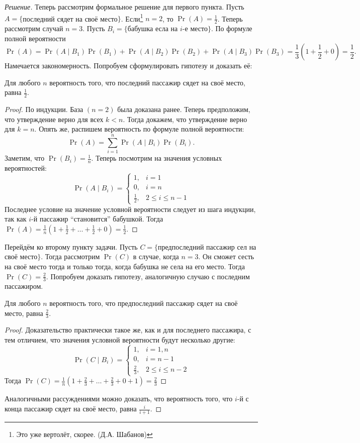 \begin{proof}[Решение]
    Теперь рассмотрим формальное решение для первого пункта. Пусть \(A = \{\)последний сядет на своё место\(\}\). Если\footnote{Это уже вертолёт, скорее. (Д.А. Шабанов)} \(n = 2\), то \(\Pr(A) = \frac{1}{2}\). Теперь рассмотрим случай \(n = 3\). Пусть \(B_{i} = \{\)бабушка есла на \(i\)-е место\(\}\). По формуле полной вероятности \[\Pr(A) = \Pr(A \mid B_{1})\Pr(B_{1}) + \Pr(A \mid B_{2})\Pr(B_{2}) + \Pr(A \mid B_{3})\Pr(B_{3}) = \frac{1}{3}\left(1 + \frac{1}{2} + 0\right) = \frac{1}{2}.\]
    Намечается закономерность. Попробуем сформулировать гипотезу и доказать её:
    \begin{hypothesis}
        Для любого \(n\) вероятность того, что последний пассажир сядет на своё место, равна \(\frac{1}{2}\).
    \end{hypothesis}
    \begin{proof}
        По индукции. База \((n = 2)\) была доказана ранее. Теперь предположим, что утверждение верно для всех \(k < n\). Тогда докажем, что утверждение верно для \(k = n\). Опять же, распишем вероятность по формуле полной вероятности:
        \[\Pr(A) = \sum\limits_{i = 1}^{n} \Pr(A \mid B_i)\Pr(B_i).\]
        Заметим, что \(\Pr(B_i) = \frac{1}{n}\). Теперь посмотрим на значения условных вероятностей:
        \[\Pr(A \mid B_i) = \begin{cases}
        1, & i = 1 \\
        0, & i = n \\
        \frac{1}{2}, & 2 \leq i \leq n - 1
        \end{cases}\]
        Последнее условие на значение условной вероятности следует из шага индукции, так как \(i\)-й пассажир ``становится'' бабушкой. Тогда \(\Pr(A) = \frac{1}{n}\left(1 + \frac{1}{2} + \ldots + \frac{1}{2} + 0\right) = \frac{1}{2}\).
    \end{proof}
    Перейдём ко второму пункту задачи. Пусть \(C = \{\)предпоследний пассажир сел на своё место\(\}\). Тогда рассмотрим \(\Pr(C)\) в случае, когда \(n = 3\). Он сможет сесть на своё место тогда и только тогда, когда бабушка не села на его место. Тогда \(\Pr(C) = \frac{2}{3}\). Попробуем доказать гипотезу, аналогичную случаю с последним пассажиром.
    \begin{hypothesis}
        Для любого \(n\) вероятность того, что предпоследний пассажир сядет на своё место, равна \(\frac{2}{3}\).
    \end{hypothesis}
    \begin{proof}
        Доказательство практически такое же, как и для последнего пассажира, с тем отличием, что значения условной вероятности будут несколько другие:
        \[\Pr(C \mid B_i) = \begin{cases}
        1, & i = 1, n \\
        0, & i = n - 1 \\
        \frac{2}{3}, & 2 \leq i \leq n - 2
        \end{cases}\]
        Тогда \(\Pr(C) = \frac{1}{n}\left(1 + \frac{2}{3} + \ldots + \frac{2}{3} + 0 + 1\right) = \frac{2}{3}\)
    \end{proof}
    Аналогичными рассуждениями можно доказать, что вероятность того, что \(i\)-й с конца пассажир сядет на своё место, равна \(\frac{i}{i + 1}\).
    

\end{proof}
